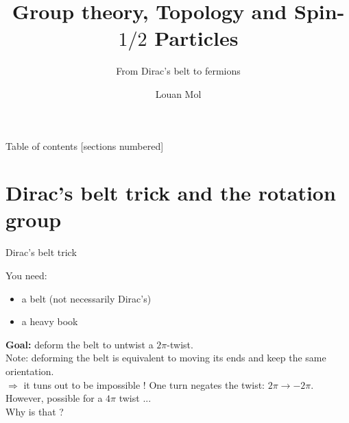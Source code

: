 \documentclass[9pt]{beamer}
\title{Group theory, Topology and Spin-$1/2$ Particles}
\subtitle{From Dirac's belt to fermions}
\date{}
\author{Louan Mol}
\institute{Unversité Libre de Bruxelles\\[2cm]{\small Brussels Summer School of Mathematics 2022}}
\renewcommand{\emph}{\alert}
\begin{document}
\maketitle

\nocite{*}

\begin{frame}{Table of contents}
    [sections numbered]
    \tableofcontents%
\end{frame}

\section{Dirac's belt trick and the rotation group}

\begin{frame}{Dirac's belt trick}
    
    You need:
    \begin{itemize}
        \item a belt (not necessarily Dirac's)
        \item a heavy book
    \end{itemize}

    \textbf{Goal:} deform the belt to untwist a $2\pi$-twist.\\[0.2cm]

    Note: deforming the belt is equivalent to moving its ends and keep the same orientation.\\[0.2cm]
    
    $\Rightarrow$ it tuns out to be \emph{impossible} ! One turn negates the twist: $2\pi\to-2\pi$.\\[0.2cm]

    However, possible for a $4\pi$ twist ...\\ \hspace{7cm} Why is that ?

\end{frame}

\end{document}
